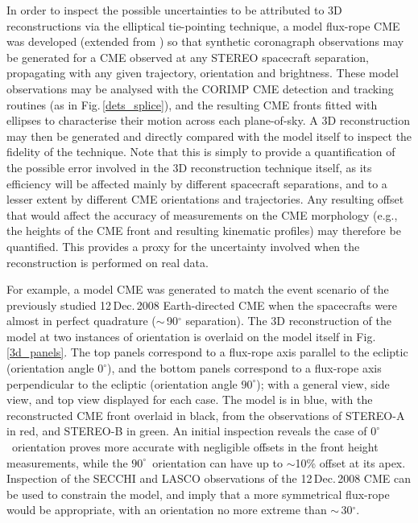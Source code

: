 \documentclass[preprint2]{aastex}
\begin{document}
In order to inspect the possible uncertainties to be attributed to 3D reconstructions via the elliptical tie-pointing technique, a model flux-rope CME was developed (extended from \citealt{2012ApJ...752..144M}) so that synthetic coronagraph observations may be generated for a CME observed at any STEREO spacecraft separation, propagating with any given trajectory, orientation and brightness. These model observations may be analysed with the CORIMP CME detection and tracking routines (as in Fig.\,\ref{dets_splice}), and the resulting CME fronts fitted with ellipses to characterise their motion across each plane-of-sky. A 3D reconstruction may then be generated and directly compared with the model itself to inspect the fidelity of the technique. Note that this is simply to provide a quantification of the possible error involved in the 3D reconstruction technique itself, as its efficiency will be affected mainly by different spacecraft separations, and to a lesser extent by different CME orientations and trajectories. Any resulting offset that would affect the accuracy of measurements on the CME morphology (e.g., the heights of the CME front and resulting kinematic profiles) may therefore be quantified. This provides a proxy for the uncertainty involved when the reconstruction is performed on real data.

For example, a model CME was generated to match the event scenario of the previously studied 12\,Dec.\,2008 Earth-directed CME when the spacecrafts were almost in perfect quadrature ($\sim$\,90$^{\circ}$ separation). The 3D reconstruction of the model at two instances of orientation is overlaid on the model itself in Fig.\,\ref{3d_panels}. The top panels correspond to a flux-rope axis parallel to the ecliptic (orientation angle $0^{\circ}$), and the bottom panels correspond to a flux-rope axis perpendicular to the ecliptic (orientation angle $90^{\circ}$); with a general view, side view, and top view displayed for each case. The model is in blue, with the reconstructed CME front overlaid in black, from the observations of STEREO-A in red, and STEREO-B in green. An initial inspection reveals the case of $0^{\circ}$~orientation proves more accurate with negligible offsets in the front height measurements, while the $90^{\circ}$~orientation can have up to $\sim$10\% offset at its apex. Inspection of the SECCHI and LASCO observations of the 12\,Dec.\,2008 CME can be used to constrain the model, and imply that a more symmetrical flux-rope would be appropriate, with an orientation no more extreme than $\sim$\,30$^{\circ}$. 
\end{document}
